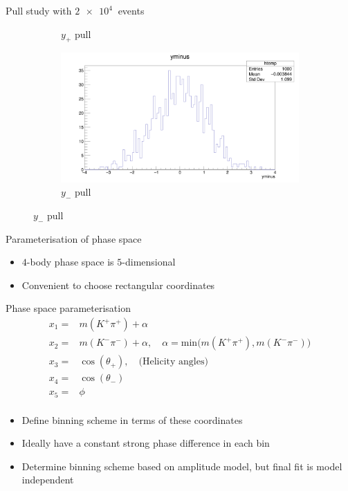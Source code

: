 \documentclass{beamer}
\begin{document}
\begin{frame}{Pull study with $\SI{2e4}{}$ events}
\begin{figure}
\begin{subfigure}{0.5\textwidth}
      \caption{$y_+$ pull}
    \end{subfigure}%
    \begin{subfigure}{0.5\textwidth}
      \includegraphics[width = 1.0\textwidth]{yminus10K1K.png}
      \caption{$y_-$ pull}
    \end{subfigure}
  \end{figure}
\end{frame}

\begin{frame}{Parameterisation of phase space}
  \begin{itemize}
    \item{$4$-body phase space is $5$-dimensional}
    \item{Convenient to choose rectangular coordinates}
  \end{itemize}
  \begin{block}{Phase space parameterisation}
    \begin{align*}
      x_1 =& m(K^+\pi^+) + \alpha \\
      x_2 =& m(K^-\pi^-) + \alpha, \quad \alpha = \text{min}\big(m(K^+\pi^+), m(K^-\pi^-)\big) \\
      x_3 =& \cos(\theta_+), \quad \text{(Helicity angles)} \\
      x_4 =& \cos(\theta_-) \\
      x_5 =& \phi \\
    \end{align*}
  \end{block}
  \begin{itemize}
    \item{Define binning scheme in terms of these coordinates}
    \item{Ideally have a constant strong phase difference in each bin}
    \item{Determine binning scheme based on amplitude model, but final fit is model independent}
  \end{itemize}
\end{frame}
\end{document}
